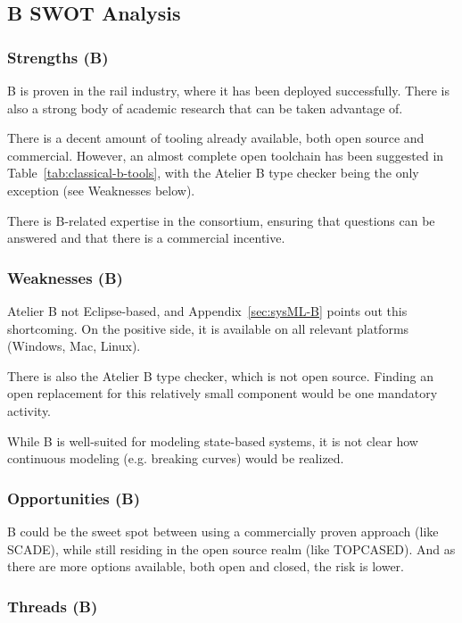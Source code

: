 \subsection{B SWOT Analysis}

\subsubsection{Strengths (B)}

B is proven in the rail industry, where it has been deployed successfully.  There is also a strong body of academic research that can be taken advantage of.

There is a decent amount of tooling already available, both open source and commercial.  However, an almost complete open toolchain has been suggested in Table~\ref{tab:classical-b-tools}, with the Atelier B type checker being the only exception (see Weaknesses below).

There is B-related expertise in the consortium, ensuring that questions can be answered and that there is a commercial incentive.

\subsubsection{Weaknesses (B)}

Atelier B not Eclipse-based, and Appendix~\ref{sec:sysML-B} points out this shortcoming.  On the positive side, it is available on all relevant platforms (Windows, Mac, Linux).

There is also the Atelier B type checker, which is not open source.  Finding an open replacement for this relatively small component would be one mandatory activity.

While B is well-suited for modeling state-based systems, it is not clear how continuous modeling (e.g. breaking curves) would be realized.


\subsubsection{Opportunities (B)}

B could be the sweet spot between using a commercially proven approach (like SCADE), while still residing in the open source realm (like TOPCASED).  And as there are more options available, both open and closed, the risk is lower.

\subsubsection{Threads (B)}

